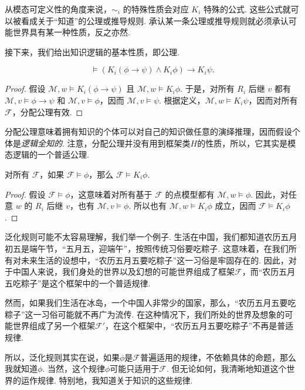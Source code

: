 从模态可定义性的角度来说，$\sim_i$ 的特殊性质会对应 $K_i$ 特殊的公式. 这些公式就可以被看成关于“知道”的公理或推导规则. 承认某一条公理或推导规则就必须承认可能世界具有某一种性质，反之亦然. 

接下来，我们给出知识逻辑的基本性质，即公理. 

\begin{proposition}[分配公理]
\[\vDash (K_i(\phi\to\psi)\wedge K_i\phi)\to K_i\psi.\]
\end{proposition}

\begin{proof}
假设 $\mathcal M,w\vDash K_i(\phi\to\psi)$ 且 $\mathcal M,w\vDash K_i \phi$. 于是，对所有 $R_i$ 后继 $v$ 都有 $\mathcal M,v\vDash\phi\to\psi$ 和 $\mathcal M,v\vDash\phi$，因而 $\mathcal M,v\vDash\psi$. 根据定义，$\mathcal M,w\vDash K_i\psi$，因而对所有 $\mathcal F$，分配公理有效. 
\end{proof}

分配公理意味着拥有知识的个体可以对自己的知识做任意的演绎推理，因而假设个体是\emph{逻辑全知的}. 注意，分配公理并没有用到框架类$H$的性质，所以，它其实是模态逻辑的一个普适公理. 

\begin{proposition}[泛化规则]
对所有 $\mathcal F$，如果 $\mathcal F\vDash\phi$，那么 $\mathcal F\vDash K_i\phi$. 
\end{proposition}

\begin{proof}
假设 $\mathcal F\vDash\phi$，这意味着对所有基于 $\mathcal F$ 的点模型都有 $\mathcal M,w\vDash\phi$. 因此，对任意 $w$ 的 $R_i$ 后继 $v$，也有 $\mathcal M,v\vDash\phi$. 所以也有 $\mathcal M,w\vDash K_i\phi$ 成立，因而 $\mathcal F\vDash K_i\phi$. 
\end{proof}


泛化规则可能不太容易理解，我们举一个例子. 生活在中国，我们都知道农历五月初五是端午节，“五月五，迎端午”，按照传统习俗要吃粽子. 这意味着，在我们所有对未来生活的设想中，“农历五月五要吃粽子”这一习俗是牢固存在的. 因此，对于中国人来说，我们身处的世界以及幻想的可能世界组成了框架$\mathcal F$，而“农历五月五吃粽子”是这个框架中的一个普适规律. 

然而，如果我们生活在冰岛，一个中国人非常少的国家，那么，“农历五月五要吃粽子”这一习俗可能就不再广为流传. 在这种情况下，我们所处的世界及想象的可能世界组成了另一个框架$\mathcal F'$，在这个框架中，“农历五月五要吃粽子”不再是普适规律. 

所以，泛化规则其实在说，如果$\phi$是$\mathcal F$普遍适用的规律，不依赖具体的命题，那么我就知道$\phi$. 当然，这个规律$\phi$可能只适用于$\mathcal F$. 但无论如何，我清晰地知道这个世界的运作规律. 特别地，我知道关于知识的这些规律. 

